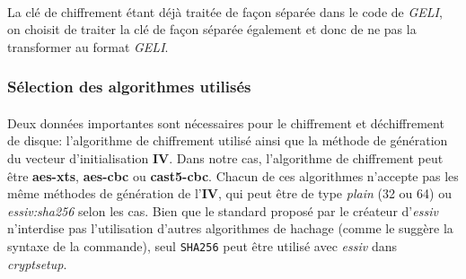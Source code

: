 \paragraph{}
La clé de chiffrement étant déjà traitée de façon séparée dans le code de 
{\em GELI}, on choisit de traiter la clé de façon séparée également et donc de 
ne pas la transformer au format {\em GELI}.


\subsubsection{Sélection des algorithmes utilisés}
\paragraph{}
Deux données importantes sont nécessaires pour le chiffrement et déchiffrement
de disque: l'algorithme de chiffrement utilisé ainsi que la méthode de
génération du vecteur d'initialisation \textbf{IV}. Dans notre cas, l'algorithme
de chiffrement peut être \textbf{aes-xts}, \textbf{aes-cbc} ou
\textbf{cast5-cbc}. Chacun de ces algorithmes n'accepte pas les même méthodes de
génération de l'\textbf{IV}, qui peut être de type \textit{plain} (32 ou 64) ou
\textit{essiv:sha256} selon les cas. Bien que le standard proposé par le
créateur d'\textit{essiv} n'interdise pas l'utilisation d'autres algorithmes de
hachage (comme le suggère la syntaxe de la commande), seul \texttt{SHA256} peut
être utilisé avec \textit{essiv} dans \textit{cryptsetup}.
